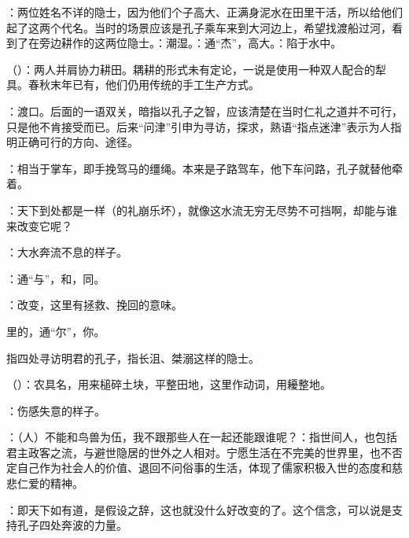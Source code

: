 {
\item {}：两位姓名不详的隐士，因为他们个子高大、正满身泥水在田里干活，所以给他们起了这两个代名。当时的场景应该是孔子乘车来到大河边上，希望找渡船过河，看到了在旁边耕作的这两位隐士。：潮湿。：通“杰”，高大。：陷于水中。

\item {}（）：两人并肩协力耕田。耦耕的形式未有定论，一说是使用一种双人配合的犁具。春秋末年已有，他们仍用传统的手工生产方式。

\item {}：渡口。后面的一语双关，暗指以孔子之智，应该清楚在当时仁礼之道并不可行，只是他不肯接受而已。后来“问津”引申为寻访，探求，熟语“指点迷津”表示为人指明正确可行的方向、途径。

\item {}：相当于掌车，即手挽驾马的缰绳。本来是子路驾车，他下车问路，孔子就替他牵着。

\item {}：天下到处都是一样（的礼崩乐坏），就像这水流无穷无尽势不可挡啊，却能与谁来改变它呢？

：大水奔流不息的样子。

：通“与”，和，同。

：改变，这里有拯救、挽回的意味。
\item {}里的，通“尔”，你。
\item {}指四处寻访明君的孔子，指长沮、桀溺这样的隐士。
\item {}（）：农具名，用来槌碎土块，平整田地，这里作动词，用耰整地。
\item {}：伤感失意的样子。
\item {}：（人）不能和鸟兽为伍，我不跟那些人在一起还能跟谁呢？：指世间人，也包括君主政客之流，与避世隐居的世外之人相对。宁愿生活在不完美的世界里，也不否定自己作为社会人的价值、退回不问俗事的生活，体现了儒家积极入世的态度和慈悲仁爱的精神。
\item {}：即天下如有道，是假设之辞，这也就没什么好改变的了。这个信念，可以说是支持孔子四处奔波的力量。
}
